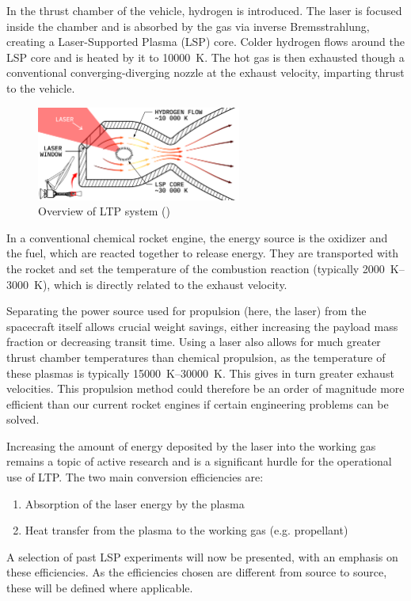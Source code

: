         In the thrust chamber of the vehicle, hydrogen is introduced. The laser is focused inside the chamber and is absorbed by the gas via inverse Bremsstrahlung, creating a Laser-Supported Plasma (LSP) core. Colder hydrogen flows around the LSP core and is heated by it to \qty{10000}{K}. The hot gas is then exhausted though a conventional converging-diverging nozzle at the exhaust velocity, imparting thrust to the vehicle.

        \begin{figure}[!ht]
            \centering
            \includegraphics[width=0.6\textwidth]{assets/2 background/chamber.pdf}
            \caption{Overview of LTP system (\textcite{duplayArgonLaserPlasmaThruster2024a})}
            \label{fig:LTP system overview}
        \end{figure}

        In a conventional chemical rocket engine, the energy source is the oxidizer and the fuel, which are reacted together to release energy. They are transported with the rocket and set the temperature of the combustion reaction (typically \qtyrange{2000}{3000}{K}), which is directly related to the exhaust velocity.
        
        Separating the power source used for propulsion (here, the laser) from the spacecraft itself allows crucial weight savings, either increasing the payload mass fraction or decreasing transit time. Using a laser also allows for much greater thrust chamber temperatures than chemical propulsion, as the temperature of these plasmas is typically \qtyrange{15000}{30000}{K}. This gives in turn greater exhaust velocities. This propulsion method could therefore be an order of magnitude more efficient than our current rocket engines if certain engineering problems can be solved.

        Increasing the amount of energy deposited by the laser into the working gas remains a topic of active research and is a significant hurdle for the operational use of LTP. The two main conversion efficiencies are:
        \begin{enumerate}
            \item Absorption of the laser energy by the plasma
            \item Heat transfer from the plasma to the working gas (e.g. propellant)
        \end{enumerate}
        A selection of past LSP experiments will now be presented, with an emphasis on these efficiencies. As the efficiencies chosen are different from source to source, these will be defined where applicable.
    
